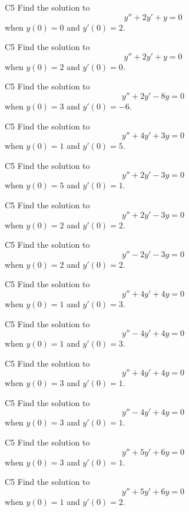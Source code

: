 \begin{problem}{C5}
Find the solution to
\[
y'' + 2y' + y = 0 
\]
when $y(0)=0$ and $y'(0)=2$.
\end{problem}

\begin{problem}{C5}
Find the solution to
\[
y'' + 2y' + y = 0 
\]
when $y(0)=2$ and $y'(0)=0$.
\end{problem}

\begin{problem}{C5}
Find the solution to
\[
y'' + 2y' - 8y = 0
\]
when $y(0)=3$ and $y'(0)=-6$.
\end{problem}

\begin{problem}{C5}
Find the solution to
\[
y'' + 4y' + 3y = 0
\]
when $y(0)=1$ and $y'(0)=5$.
\end{problem}

\begin{problem}{C5}
Find the solution to
\[
y'' + 2y' - 3y = 0
\]
when $y(0)=5$ and $y'(0)=1$.
\end{problem}

\begin{problem}{C5}
Find the solution to
\[
y'' + 2y' - 3y = 0
\]
when $y(0)=2$ and $y'(0)=2$.
\end{problem}

\begin{problem}{C5}
Find the solution to
\[
y'' - 2y' - 3y = 0
\]
when $y(0)=2$ and $y'(0)=2$.
\end{problem}

\begin{problem}{C5}
Find the solution to
\[
y'' + 4y' + 4y = 0
\]
when $y(0)=1$ and $y'(0)=3$.
\end{problem}

\begin{problem}{C5}
Find the solution to
\[
y'' - 4y' + 4y = 0
\]
when $y(0)=1$ and $y'(0)=3$.
\end{problem}

\begin{problem}{C5}
Find the solution to
\[
y'' + 4y' + 4y = 0
\]
when $y(0)=3$ and $y'(0)=1$.
\end{problem}

\begin{problem}{C5}
Find the solution to
\[
y'' - 4y' + 4y = 0
\]
when $y(0)=3$ and $y'(0)=1$.
\end{problem}

\begin{problem}{C5}
Find the solution to
\[
y'' + 5y' + 6y = 0
\]
when $y(0)=3$ and $y'(0)=1$.
\end{problem}

\begin{problem}{C5}
Find the solution to
\[
y'' + 5y' + 6y = 0
\]
when $y(0)=1$ and $y'(0)=2$.
\end{problem}

